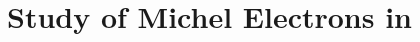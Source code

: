 \chapter{\label{ch:michel}Study of Michel Electrons in \protodune{}} 

\minitoc

%
% 
% 
% 
% 
% 
%

